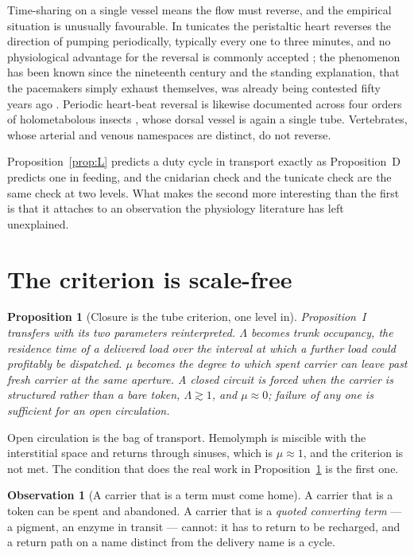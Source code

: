 \documentclass[11pt]{article}
\theoremstyle{plain}
\newtheorem{proposition}[theorem]{Proposition}
\theoremstyle{definition}
\newtheorem{observation}[theorem]{Observation}
\begin{document}
Time-sharing on a single vessel means the flow must reverse, and the empirical situation is
unusually favourable. In tunicates the peristaltic heart reverses the direction of pumping
periodically, typically every one to three minutes, and no physiological advantage for the reversal
is commonly accepted \cite{konrad2016,kriebel1968}; the phenomenon has been known since the
nineteenth century and the standing explanation, that the pacemakers simply exhaust themselves, was
already being contested fifty years ago \cite{heron1975}. Periodic heart-beat reversal is likewise
documented across four orders of holometabolous insects \cite{gerould1933}, whose dorsal vessel is
again a single tube. Vertebrates, whose arterial and venous namespaces are distinct, do not reverse.

Proposition~\ref{prop:L} predicts a duty cycle in transport exactly as Proposition~D predicts one in
feeding, and the cnidarian check and the tunicate check are the same check at two levels. What makes
the second more interesting than the first is that it attaches to an observation the physiology
literature has left unexplained.

\section{The criterion is scale-free}
\label{sec:scalefree}

\begin{proposition}[Closure is the tube criterion, one level in]
\label{prop:M}
Proposition~I transfers with its two parameters reinterpreted. $\Lambda$ becomes trunk occupancy, the
residence time of a delivered load over the interval at which a further load could profitably be
dispatched. $\mu$ becomes the degree to which spent carrier can leave past fresh carrier at the same
aperture. A \emph{closed} circuit is forced when the carrier is structured rather than a bare token,
$\Lambda \gtrsim 1$, and $\mu \approx 0$; failure of any one is sufficient for an open circulation.
\end{proposition}

Open circulation is the bag of transport. Hemolymph is miscible with the interstitial space and
returns through sinuses, which is $\mu \approx 1$, and the criterion is not met. The condition that
does the real work in Proposition~\ref{prop:M} is the first one.

\begin{observation}[A carrier that is a term must come home]
\label{obs:carrier}
A carrier that is a token can be spent and abandoned. A carrier that is a \emph{quoted converting
term} --- a pigment, an enzyme in transit --- cannot: it has to return to be recharged, and a return
path on a name distinct from the delivery name is a cycle.
\end{observation}
\end{document}
